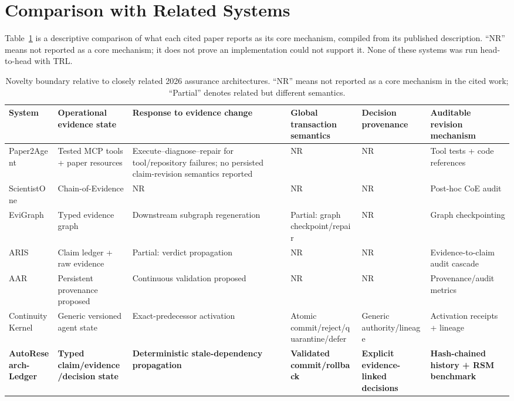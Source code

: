 \documentclass[journal]{IEEEtran}
\begin{document}
\section{Comparison with Related Systems}
Table~\ref{tab:novelty_boundary} is a descriptive comparison of what each cited paper reports as its core mechanism, compiled from its published description. ``NR'' means not reported as a core mechanism; it does not prove an implementation could not support it. None of these systems was run head-to-head with TRL.

\begin{table}[!t]
\centering
\caption{Novelty boundary relative to closely related 2026 assurance architectures. ``NR'' means not reported as a core mechanism in the cited work; ``Partial'' denotes related but different semantics.}
\label{tab:novelty_boundary}
\scriptsize
\begin{tabularx}{\textwidth}{l>{\raggedright\arraybackslash}X>{\raggedright\arraybackslash}X>{\raggedright\arraybackslash}X>{\raggedright\arraybackslash}X>{\raggedright\arraybackslash}X}
\toprule
System & Operational evidence state & Response to evidence change & Global transaction semantics & Decision provenance & Auditable revision mechanism \\
\midrule
Paper2Agent \cite{miao2026paper2agent} & Tested MCP tools + paper resources & Execute--diagnose--repair for tool/repository failures; no persisted claim-revision semantics reported & NR & NR & Tool tests + code references \\
ScientistOne \cite{meng2026scientistone} & Chain-of-Evidence & NR & NR & NR & Post-hoc CoE audit \\
EviGraph \cite{ren2026evigraph} & Typed evidence graph & Downstream subgraph regeneration & Partial: graph checkpoint/repair & NR & Graph checkpointing \\
ARIS \cite{yang2026aris} & Claim ledger + raw evidence & Partial: verdict propagation & NR & NR & Evidence-to-claim audit cascade \\
AAR \cite{rasheed2026auditability} & Persistent provenance proposed & Continuous validation proposed & NR & NR & Provenance/audit metrics \\
Continuity Kernel \cite{he2026continuity} & Generic versioned agent state & Exact-predecessor activation & Atomic commit/reject/quarantine/defer & Generic authority/lineage & Activation receipts + lineage \\
\textbf{AutoResearch-Ledger} & \textbf{Typed claim/evidence/decision state} & \textbf{Deterministic stale-dependency propagation} & \textbf{Validated commit/rollback} & \textbf{Explicit evidence-linked decisions} & \textbf{Hash-chained history + RSM benchmark} \\
\bottomrule
\end{tabularx}
\end{table}
\end{document}
